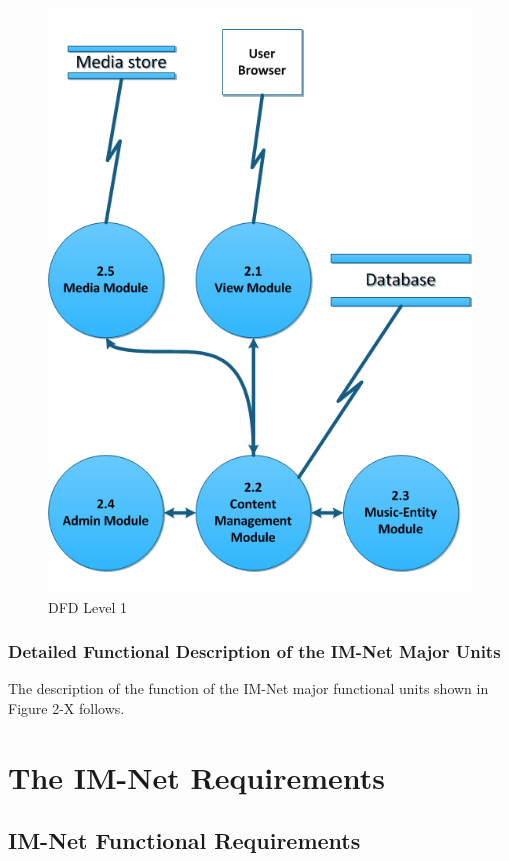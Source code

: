 \documentclass[letterpaper]{article}
\begin{document}
\begin{figure}[h!]
\centering
\includegraphics{DFD_level_1.png}
\caption{DFD Level 1}
\label{fig:DFD_level_1}
\end{figure}
\eject
 
\subsubsection{Detailed Functional Description of the IM-Net Major Units}

The description of the function of the IM-Net major functional units shown in Figure 2-X follows.

\eject

\section{The IM-Net Requirements}
 
\subsection{IM-Net Functional Requirements}
\end{document}
